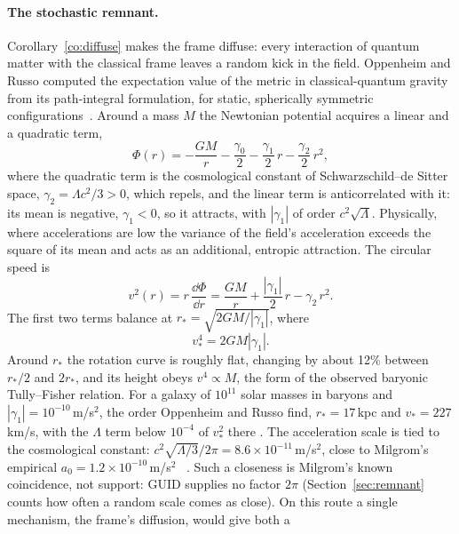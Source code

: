 \paragraph{The stochastic remnant.} Corollary~\ref{co:diffuse} makes the frame diffuse: every interaction of quantum matter with the
classical frame leaves a random kick in the field. Oppenheim and Russo computed the expectation value of the metric in classical-quantum
gravity from its path-integral formulation, for static, spherically symmetric configurations~\cite{oppenheimrusso}. Around a mass $M$ the
Newtonian potential acquires a linear and a quadratic term,
\begin{equation}\label{eq:stochpot}
\Phi(r)=-\frac{GM}{r}-\frac{\gamma_0}{2}-\frac{\gamma_1}{2}\,r-\frac{\gamma_2}{2}\,r^2 ,
\end{equation}
where the quadratic term is the cosmological constant of Schwarzschild--de Sitter space, $\gamma_2=\Lambda c^2/3>0$, which repels, and
the linear term is anticorrelated with it: its mean is negative, $\gamma_1<0$, so it attracts, with $|\gamma_1|$ of order $c^2\sqrt\Lambda$.
Physically, where accelerations are low the variance of the field's acceleration exceeds the square of its mean and acts as an additional,
entropic attraction. The circular speed is
\begin{equation}\label{eq:vcirc}
v^2(r)=r\,\frac{\dd\Phi}{\dd r}=\frac{GM}{r}+\frac{|\gamma_1|}{2}\,r-\gamma_2\,r^2 .
\end{equation}
The first two terms balance at $r_*=\sqrt{2GM/|\gamma_1|}$, where
\begin{equation}\label{eq:btf}
v_*^4=2GM|\gamma_1| .
\end{equation}
Around $r_*$ the rotation curve is roughly flat, changing by about 12\% between $r_*/2$ and $2r_*$, and its height obeys $v^4\propto M$,
the form of the observed baryonic Tully--Fisher relation. For a galaxy of $10^{11}$ solar masses in baryons and $|\gamma_1|=10^{-10}$\,m/s$^2$,
the order Oppenheim and Russo find, $r_*=17$\,kpc and $v_*=227$\,km/s, with the $\Lambda$ term below $10^{-4}$ of $v_*^2$ there .
The acceleration scale is tied to the cosmological constant: $c^2\sqrt{\Lambda/3}/2\pi=8.6\times10^{-11}$\,m/s$^2$, close to Milgrom's
empirical $a_0=1.2\times10^{-10}$\,m/s$^2$~\cite{milgrom} . Such a closeness is Milgrom's known coincidence, not support:
GUID supplies no factor $2\pi$ (Section~\ref{sec:remnant} counts how often a random scale comes as close). On this route a single mechanism, the frame's diffusion, would give both a
